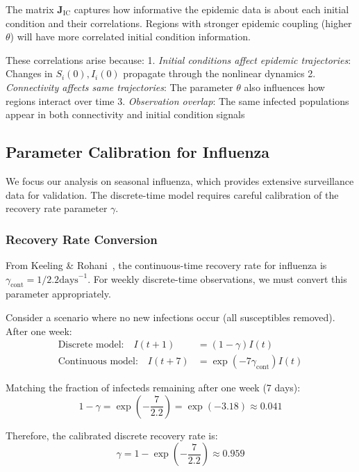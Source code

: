 The matrix $\mathbf{J}_{\text{IC}}$ captures how informative the epidemic data is about each initial condition and their correlations. Regions with stronger epidemic coupling (higher $\theta$) will have more correlated initial condition information.

These correlations arise because:
1. \emph{Initial conditions affect epidemic trajectories}: Changes in $S_i(0), I_i(0)$ propagate through the nonlinear dynamics
2. \emph{Connectivity affects same trajectories}: The parameter $\theta$ also influences how regions interact over time
3. \emph{Observation overlap}: The same infected populations appear in both connectivity and initial condition signals

\subsection{Parameter Calibration for Influenza}

We focus our analysis on seasonal influenza, which provides extensive surveillance data for validation. The discrete-time model requires careful calibration of the recovery rate parameter $\gamma$.

\subsubsection{Recovery Rate Conversion}

From Keeling \& Rohani~\cite{keeling2008modeling}, the continuous-time
recovery rate for influenza is $\gamma_{\text{cont}} = 1/2.2 \text{
  days}^{-1}$. For weekly discrete-time observations, we must convert
this parameter appropriately.

Consider a scenario where no new infections occur (all susceptibles
removed). After one week:
\begin{align}
\text{Discrete model:} \quad I(t+1) &= (1-\gamma) I(t) \\
\text{Continuous model:} \quad I(t+7) &= \exp(-7\gamma_{\text{cont}}) I(t)
\end{align}

Matching the fraction of infecteds remaining after one week (7 days):
\begin{equation}
1 - \gamma = \exp\left(-\frac{7}{2.2}\right) = \exp(-3.18) \approx 0.041
\end{equation}

Therefore, the calibrated discrete recovery rate is:
\begin{equation}
\gamma = 1 - \exp\left(-\frac{7}{2.2}\right) \approx 0.959
\end{equation}


